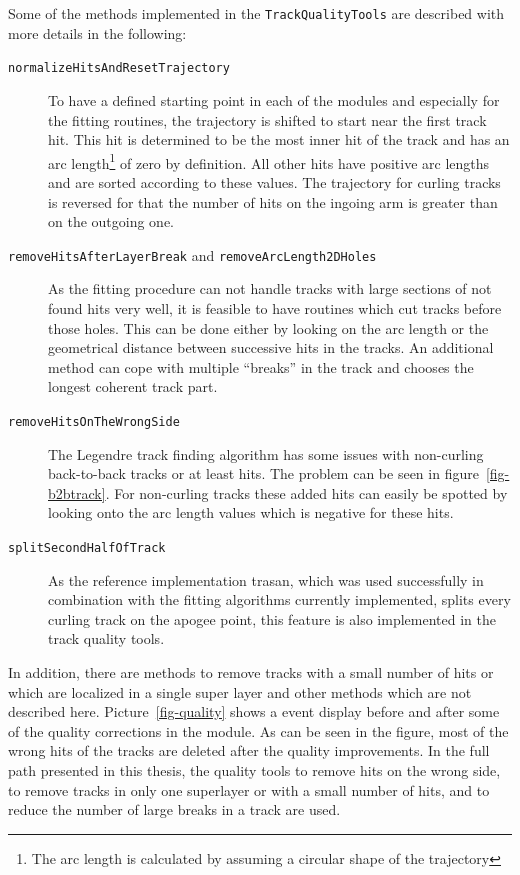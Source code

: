 Some of the methods implemented in the \texttt{TrackQualityTools} are described with more details in the following:
\begin{description}
 \item[\texttt{normalizeHitsAndResetTrajectory}] To have a defined starting point in each of the modules and especially for the fitting routines, the trajectory is shifted to start near the first track hit. This hit is determined to be the most inner hit of the track and has an arc length\footnote{The arc length is calculated by assuming a circular shape of the trajectory} of zero by definition. All other hits have positive arc lengths and are sorted according to these values. The trajectory for curling tracks is reversed for that the number of hits on the ingoing arm is greater than on the outgoing one.
 \item[\texttt{removeHitsAfterLayerBreak} and \texttt{removeArcLength2DHoles}]  As the fitting procedure can not handle tracks with large sections of not found hits very well, it is feasible to have routines which cut tracks before those holes. This can be done either by looking on the arc length or the geometrical distance between successive hits in the tracks. An additional method can cope with multiple ``breaks'' in the track and chooses the longest coherent track part.
 \item[\texttt{removeHitsOnTheWrongSide}] The Legendre track finding algorithm has some issues with non-curling back-to-back tracks or at least hits. The problem can be seen in figure~\ref{fig-b2btrack}. For non-curling tracks these added hits can easily be spotted by looking onto the arc length values which is negative for these hits.
 \item[\texttt{splitSecondHalfOfTrack}] As the reference implementation trasan, which was used successfully in combination with the fitting algorithms currently implemented, splits every curling track on the apogee point, this feature is also implemented in the track quality tools.
\end{description}
In addition, there are methods to remove tracks with a small number of hits or which are localized in a single super layer and other methods which are not described here. Picture~\ref{fig-quality} shows a event display before and after some of the quality corrections in the module. As can be seen in the figure, most of the wrong hits of the tracks are deleted after the quality improvements. In the full path presented in this thesis, the quality tools to remove hits on the wrong side, to remove tracks in only one superlayer or with a small number of hits, and to reduce the number of large breaks in a track are used.

